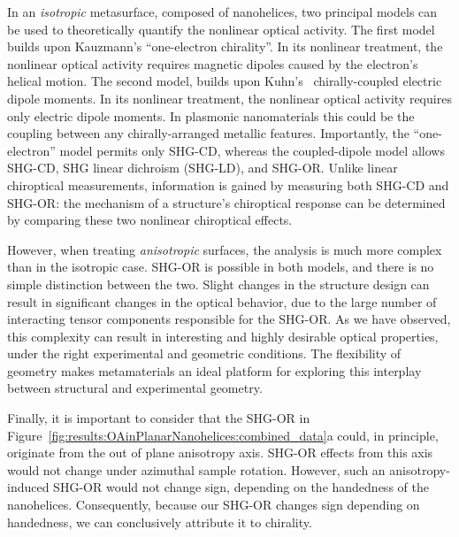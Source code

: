 In an \textit{isotropic} metasurface, composed of nanohelices, two principal models can be used to theoretically quantify the nonlinear optical activity. The first model builds upon Kauzmann's ``one-electron chirality''.\cite{Kauzmann1957a}
In its nonlinear treatment, the nonlinear optical activity requires magnetic dipoles caused by the electron's helical motion.\cite{Hache2001a}
The second model, builds upon Kuhn's~\cite{Kuhn1930} chirally-coupled electric dipole moments. In its nonlinear treatment, the nonlinear optical activity requires only electric dipole moments.\cite{Hache2001a}
In plasmonic nanomaterials this could be the coupling between any chirally-arranged metallic features. Importantly, the ``one-electron'' model permits only SHG-CD, whereas the coupled-dipole model allows SHG-CD, SHG linear dichroism (SHG-LD), and SHG-OR.\cite{Fischer2005a}
Unlike linear chiroptical measurements, information is gained by measuring both SHG-CD and SHG-OR: the mechanism of a structure's chiroptical response can be determined by comparing these two nonlinear chiroptical effects. 

However, when treating \textit{anisotropic} surfaces, the analysis is much more complex than in the isotropic case. SHG-OR is possible in both models, and there is no simple distinction between the two. Slight changes in the structure design can result in significant changes in the optical behavior, due to the large number of interacting tensor components responsible for the SHG-OR. As we have observed, this complexity can result in interesting and highly desirable optical properties, under the right experimental and geometric conditions. The flexibility of geometry makes metamaterials an ideal platform for exploring this interplay between structural and experimental geometry. 

Finally, it is important to consider that the SHG-OR in Figure~\ref{fig:results:OAinPlanarNanohelices:combined_data}a could, in principle, originate from the out of plane anisotropy axis. SHG-OR effects from this axis would not change under azimuthal sample rotation. However, such an anisotropy-induced SHG-OR would not change sign, depending on the handedness of the nanohelices. Consequently, because our SHG-OR changes sign depending on handedness, we can conclusively attribute it to chirality. 

